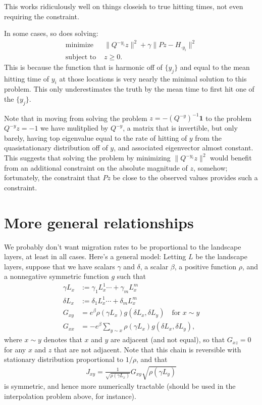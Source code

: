 \documentclass{article}
\newcommand{\bone}{\mathbf{1}}
\begin{document}
This works ridiculously well on things closeish to true hitting times,
not even requiring the constraint.

In some cases, so does solving:
\begin{align}
    \text{minimize } & \| Q^{-y_i} z \|^2 + \gamma \| Pz - H_{\cdot y_i} \|^2 \\
    \text{subject to } &  z \ge 0 .
\end{align}
This is because the function that is harmonic off of $\{y_j\}$
and equal to the mean hitting time of $y_i$ at those locations
is very nearly the minimal solution to this problem.
This only underestimates the truth by the mean time to first hit one of the $\{y_j\}$.

Note that in moving from solving the problem $z = - (Q^{-y})^{-1} \bone$ to the problem $ Q^{-y} z = -1$
we have mulitplied by $Q^{-y}$,
a matrix that is invertible,
but only barely,
having top eigenvalue equal to the rate of hitting of $y$ from the quasistationary distribution off of $y$,
and associated eigenvector almost constant.
This suggests that solving the problem by minimizing $ \| Q^{-y_i} z \|^2$
would benefit from an additional constraint on the absolute magnitude of $z$, somehow;
fortunately, the constraint that $Pz$ be close to the observed values provides such a constraint.


\section*{More general relationships}

We probably don't want migration rates to be proportional to the landscape layers,
at least in all cases.
Here's a general model:
Letting $L$ be the landscape layers,
suppose that we have scalars $\gamma$ and $\delta$, 
a scalar $\beta$,
a positive function $\rho$, 
and a nonnegative symmetric function $g$ such that
\begin{align}
  \gamma L_x &:= \gamma_1 L^1_x \cdots + \gamma_m L^m_x  \\
  \delta L_x &:= \delta_1 L^1_x \cdots + \delta_m L^m_x  \\
  G_{xy} &= e^\beta \rho( \gamma L_x ) g( \delta L_x, \delta L_y ) \quad \text{for $x \sim y$} \\
  G_{xx} &= - e^\beta \sum_{y \sim x} \rho( \gamma L_x ) g( \delta L_x, \delta L_y ) ,
\end{align}
where $x \sim y$ denotes that $x$ and $y$ are adjacent (and not equal),
so that $G_{xz} = 0$ for any $x$ and $z$ that are not adjacent.
Note that this chain is reversible with stationary distribution proportional to $1/\rho$,
and that
\begin{align}
  J_{xy} = \frac{1}{\sqrt{\rho(\gamma L_x)}} G_{xy} \sqrt{ \rho(\gamma L_y) }
\end{align}
is symmetric, and hence more numerically tractable (should be used in the interpolation problem above, for instance).
\end{document}
